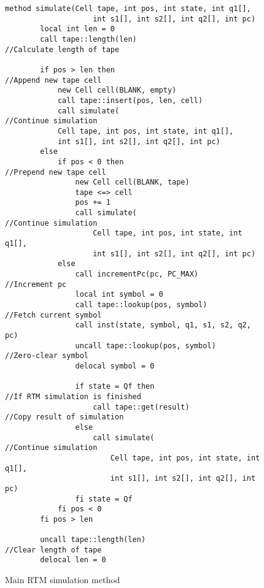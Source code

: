 \begin{figure}[ht]
    \centering
    \begin{lstlisting}[style = basic, language = roopl]
    method simulate(Cell tape, int pos, int state, int q1[], 
                    int s1[], int s2[], int q2[], int pc)
        local int len = 0
        call tape::length(len)                                  //Calculate length of tape

        if pos > len then                                       //Append new tape cell
            new Cell cell(BLANK, empty)
            call tape::insert(pos, len, cell)
            call simulate(                                      //Continue simulation
            Cell tape, int pos, int state, int q1[], 
            int s1[], int s2[], int q2[], int pc) 
        else
            if pos < 0 then                                     //Prepend new tape cell
                new Cell cell(BLANK, tape)
                tape <=> cell
                pos += 1
                call simulate(                                  //Continue simulation
                    Cell tape, int pos, int state, int q1[], 
                    int s1[], int s2[], int q2[], int pc)         
            else
                call incrementPc(pc, PC_MAX)                    //Increment pc
                local int symbol = 0
                call tape::lookup(pos, symbol)                  //Fetch current symbol
                call inst(state, symbol, q1, s1, s2, q2, pc)
                uncall tape::lookup(pos, symbol)                //Zero-clear symbol    
                delocal symbol = 0
                             
                if state = Qf then                              //If RTM simulation is finished
                    call tape::get(result)                      //Copy result of simulation
                else
                    call simulate(                              //Continue simulation
                        Cell tape, int pos, int state, int q1[], 
                        int s1[], int s2[], int q2[], int pc)     
                fi state = Qf
            fi pos < 0
        fi pos > len

        uncall tape::length(len)                                //Clear length of tape
        delocal len = 0
    \end{lstlisting}
    \caption{Main RTM simulation method}
    \label{fig:rtm-simulation-method}
\end{figure} 

